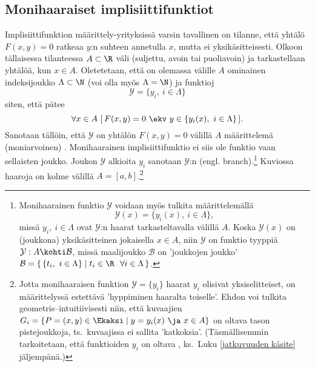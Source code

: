 \subsection*{Monihaaraiset implisiittifunktiot}

Implisiittifunktion määrittely-yrityksissä varsin tavallinen on tilanne, että yhtälö $F(x,y)=0$
ratkeaa $y$:n suhteen annetulla $x$, mutta ei yksikäsitteisesti. Olkoon tällaisessa tilanteessa
$A\subset\R$ väli (suljettu, avoin tai puoliavoin) ja tarkastellaan yhtälöä, kun $x \in A$.
Oletetetaan, että on olemassa välille $A$ ominainen indeksijoukko $\Lambda\subset\N$ 
(voi olla myös $\Lambda=\N$) ja funktioj
\[
\mathcal{Y}=\{y_i, \ i \in \Lambda \}
\]
siten, että pätee
\[
\forall x \in A\ [\,F(x,y)=0\ \ekv\ y\in\{y_i(x),\ i\in\Lambda\}\,].
\]
Sanotaan tällöin, että $\mathcal{Y}$ on yhtälön $F(x,y)=0$ välillä $A$ määrittelemä 
 (moniarvoinen) . Monihaarainen implisiittifunktio
ei siis ole funktio vaan sellaisten joukko. Joukon $\mathcal{Y}$ alkioita $y_i$ sanotaan
%
$\mathcal{Y}$:n  (engl. branch).\footnote[2]{Monihaarainen funktio $\mathcal{Y}$
voidaan myös tulkita  määrittelemällä
\[ 
\mathcal{Y}(x) = \{y_i(x),\ i \in \Lambda\},
\]
missä $y_i,\ i \in \Lambda$ ovat $\mathcal{Y}$:n haarat tarkasteltavalla välillä $A$. Koska
$\mathcal{Y}(x)$ on (joukkona) yksikäsitteinen jokaisella $x \in A$, niin $\mathcal{Y}$ on
funktio tyyppiä $\mathcal{Y}: A \kohti \mathcal{B}$, missä maalijoukko $\mathcal{B}$ on
'joukkojen joukko' 
$\mathcal{B} = \{\,\{t_i, \ i \in \Lambda\} \mid t_i \in \R\ \ \forall i \in \Lambda\,\}$.
} 
Kuviossa haaroja on kolme välillä $A=[a,b]$.\footnote[3]{Jotta monihaaraisen funktion 
$\mathcal{Y}=\{y_i\}$ haarat $y_i$ olisivat yksiselitteiset, on määrittelyssä estettävä 
'hyppiminen haaralta toiselle'. Ehdon voi tulkita geometris--intuitiivisesti niin, että
kuvaajien $G_i=\{P=(x,y)\in\Ekaksi \mid y=y_i(x)\ \ja\ x \in A\}$ on oltava 
tason pistejoukkoja, ts.\ kuvaajissa ei sallita 'katkoksia'. (Täsmällisemmin tarkoitetaan,
että funktioiden $y_i$ on oltava , ks.\ Luku \ref{jatkuvuuden käsite}
jäljempänä.)}
